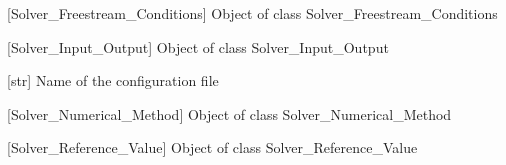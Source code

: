 \documentclass[letterpaper,10pt,english]{sphinxmanual}
\begin{document}
\begin{fulllineitems}
\begin{fulllineitems}
\label{\detokenize{modules:su2.SU2_Config.free_cond}}
\pysigstartsignatures
{}
\pysigstopsignatures
\sphinxAtStartPar
{[}Solver\_Freestream\_Conditions{]} Object of class Solver\_Freestream\_Conditions

\end{fulllineitems}


\begin{fulllineitems}
\label{\detokenize{modules:su2.SU2_Config.inout}}
\pysigstartsignatures
{}
\pysigstopsignatures
\sphinxAtStartPar
{[}Solver\_Input\_Output{]} Object of class Solver\_Input\_Output

\end{fulllineitems}


\begin{fulllineitems}
\label{\detokenize{modules:su2.SU2_Config.name}}
\pysigstartsignatures
{}
\pysigstopsignatures
\sphinxAtStartPar
{[}str{]} Name of the configuration file

\end{fulllineitems}


\begin{fulllineitems}
\label{\detokenize{modules:su2.SU2_Config.num}}
\pysigstartsignatures
{}
\pysigstopsignatures
\sphinxAtStartPar
{[}Solver\_Numerical\_Method{]} Object of class Solver\_Numerical\_Method

\end{fulllineitems}


\begin{fulllineitems}
\label{\detokenize{modules:su2.SU2_Config.ref}}
\pysigstartsignatures
{}
\pysigstopsignatures
\sphinxAtStartPar
{[}Solver\_Reference\_Value{]} Object of class Solver\_Reference\_Value


\end{fulllineitems}
\end{fulllineitems}
\end{document}
